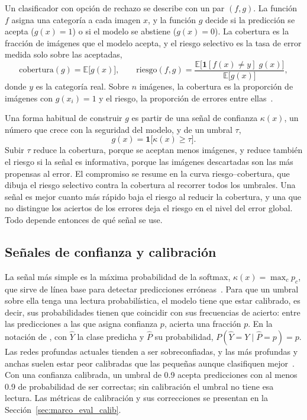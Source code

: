 Un clasificador con opción de rechazo se describe con un par $(f, g)$. La función $f$ asigna una categoría a
cada imagen $x$, y la función $g$ decide si la predicción se acepta ($g(x) = 1$) o si el modelo se abstiene
($g(x) = 0$). La cobertura es la fracción de imágenes que el modelo acepta, y el riesgo selectivo es la tasa
de error medida solo sobre las aceptadas,
\begin{equation}
    \mathrm{cobertura}(g) = \mathbb{E}\bigl[g(x)\bigr], \qquad
    \mathrm{riesgo}(f, g) = \frac{\mathbb{E}\bigl[\mathbf{1}[f(x) \neq y]\; g(x)\bigr]}{\mathbb{E}\bigl[g(x)\bigr]},
    \label{eq:marco_riesgo_selectivo}
\end{equation}
donde $y$ es la categoría real. Sobre $n$ imágenes, la cobertura es la proporción de imágenes con
$g(x_i) = 1$ y el riesgo, la proporción de errores entre ellas~\cite{elyaniv2010foundations,geifman2017selective}.

Una forma habitual de construir $g$ es partir de una señal de confianza $\kappa(x)$, un número que crece con la
seguridad del modelo, y de un umbral $\tau$,
\begin{equation}
    g(x) = \mathbf{1}\bigl[\kappa(x) \ge \tau\bigr].
    \label{eq:marco_umbral_confianza}
\end{equation}
Subir $\tau$ reduce la cobertura, porque se aceptan menos imágenes, y reduce también el riesgo si la señal es
informativa, porque las imágenes descartadas son las más propensas al error. El compromiso se resume en la
curva riesgo--cobertura, que dibuja el riesgo selectivo contra la cobertura al recorrer todos los umbrales.
Una señal es mejor cuanto más rápido baja el riesgo al reducir la cobertura, y una que no distingue los
aciertos de los errores deja el riesgo en el nivel del error global. Todo depende entonces de qué señal se use.

\subsection{Señales de confianza y calibración}
\label{sec:marco_senales_confianza}

La señal más simple es la máxima probabilidad de la softmax, $\kappa(x) = \max_c p_c$, que sirve de línea
base para detectar predicciones erróneas~\cite{hendrycks2017baseline}. Para que un umbral sobre ella tenga una
lectura probabilística, el modelo tiene que estar calibrado, es decir, sus probabilidades tienen que coincidir con sus frecuencias de acierto: entre las
predicciones a las que asigna confianza $p$, acierta una fracción $p$. En la notación de
\textcite{guo2017calibration}, con $\hat{Y}$ la clase predicha y $\hat{P}$ su probabilidad,
$P(\hat{Y} = Y \mid \hat{P} = p) = p$. Las redes profundas actuales tienden a ser sobreconfiadas, y las más
profundas y anchas suelen estar peor calibradas que las pequeñas aunque clasifiquen
mejor~\cite{guo2017calibration}. Con una confianza calibrada, un umbral de 0.9 acepta predicciones con al
menos 0.9 de probabilidad de ser correctas; sin calibración el umbral no tiene esa lectura. Las métricas de
calibración y sus correcciones se presentan en la Sección~\ref{sec:marco_eval_calib}.

